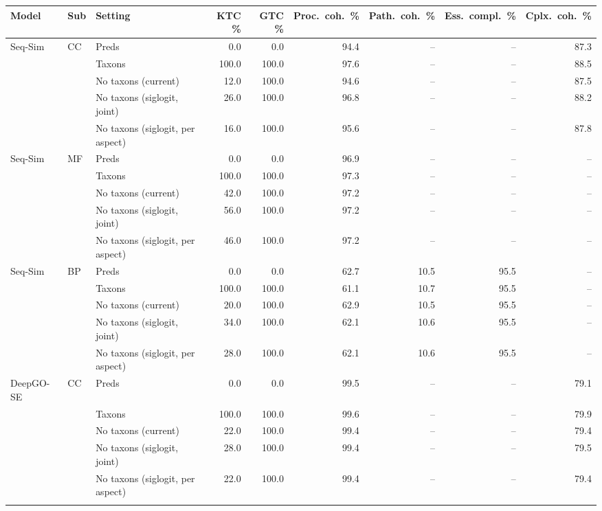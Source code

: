 \begin{tabular}{lllrrrrrr}
\toprule
Model & Sub & Setting & KTC \% & GTC \% & Proc.\ coh.\ \% & Path.\ coh.\ \% & Ess.\ compl.\ \% & Cplx.\ coh.\ \% \\
\midrule
Seq-Sim & CC & Preds & 0.0 & 0.0 & 94.4 & -- & -- & 87.3 \\
 &  & Taxons & 100.0 & 100.0 & 97.6 & -- & -- & 88.5 \\
 &  & No taxons (current) & 12.0 & 100.0 & 94.6 & -- & -- & 87.5 \\
 &  & No taxons (siglogit, joint) & 26.0 & 100.0 & 96.8 & -- & -- & 88.2 \\
 &  & No taxons (siglogit, per aspect) & 16.0 & 100.0 & 95.6 & -- & -- & 87.8 \\
\addlinespace
Seq-Sim & MF & Preds & 0.0 & 0.0 & 96.9 & -- & -- & -- \\
 &  & Taxons & 100.0 & 100.0 & 97.3 & -- & -- & -- \\
 &  & No taxons (current) & 42.0 & 100.0 & 97.2 & -- & -- & -- \\
 &  & No taxons (siglogit, joint) & 56.0 & 100.0 & 97.2 & -- & -- & -- \\
 &  & No taxons (siglogit, per aspect) & 46.0 & 100.0 & 97.2 & -- & -- & -- \\
\addlinespace
Seq-Sim & BP & Preds & 0.0 & 0.0 & 62.7 & 10.5 & 95.5 & -- \\
 &  & Taxons & 100.0 & 100.0 & 61.1 & 10.7 & 95.5 & -- \\
 &  & No taxons (current) & 20.0 & 100.0 & 62.9 & 10.5 & 95.5 & -- \\
 &  & No taxons (siglogit, joint) & 34.0 & 100.0 & 62.1 & 10.6 & 95.5 & -- \\
 &  & No taxons (siglogit, per aspect) & 28.0 & 100.0 & 62.1 & 10.6 & 95.5 & -- \\
\midrule
DeepGO-SE & CC & Preds & 0.0 & 0.0 & 99.5 & -- & -- & 79.1 \\
 &  & Taxons & 100.0 & 100.0 & 99.6 & -- & -- & 79.9 \\
 &  & No taxons (current) & 22.0 & 100.0 & 99.4 & -- & -- & 79.4 \\
 &  & No taxons (siglogit, joint) & 28.0 & 100.0 & 99.4 & -- & -- & 79.5 \\
 &  & No taxons (siglogit, per aspect) & 22.0 & 100.0 & 99.4 & -- & -- & 79.4 \\
\addlinespace

\end{tabular}

